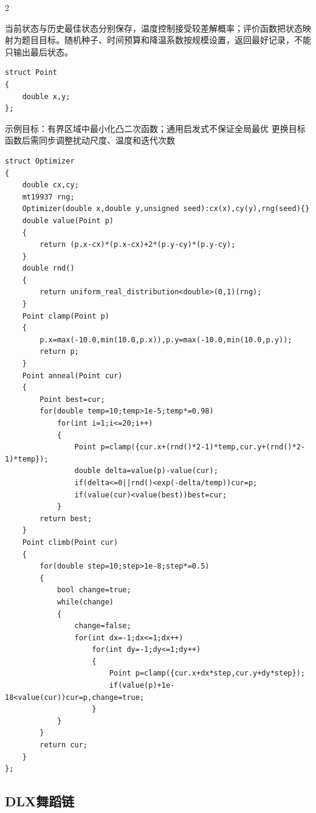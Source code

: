 \documentclass[UTF8,fontset=fandol,a4paper,twoside]{ctexart}
\newcommand{\note}[1]{{\fontsize{10}{12}\selectfont #1\par}}
\begin{document}
\begin{multicols}{2}
\note{当前状态与历史最佳状态分别保存，温度控制接受较差解概率；评价函数把状态映射为题目目标。随机种子、时间预算和降温系数按规模设置，返回最好记录，不能只输出最后状态。}
\begin{lstlisting}
struct Point
{
    double x,y;
};
\end{lstlisting}
\note{示例目标：有界区域中最小化凸二次函数；通用启发式不保证全局最优 更换目标函数后需同步调整扰动尺度、温度和迭代次数}
\begin{lstlisting}
struct Optimizer
{
    double cx,cy;
    mt19937 rng;
    Optimizer(double x,double y,unsigned seed):cx(x),cy(y),rng(seed){}
    double value(Point p)
    {
        return (p.x-cx)*(p.x-cx)+2*(p.y-cy)*(p.y-cy);
    }
    double rnd()
    {
        return uniform_real_distribution<double>(0,1)(rng);
    }
    Point clamp(Point p)
    {
        p.x=max(-10.0,min(10.0,p.x)),p.y=max(-10.0,min(10.0,p.y));
        return p;
    }
    Point anneal(Point cur)
    {
        Point best=cur;
        for(double temp=10;temp>1e-5;temp*=0.98)
            for(int i=1;i<=20;i++)
            {
                Point p=clamp({cur.x+(rnd()*2-1)*temp,cur.y+(rnd()*2-1)*temp});
                double delta=value(p)-value(cur);
                if(delta<=0||rnd()<exp(-delta/temp))cur=p;
                if(value(cur)<value(best))best=cur;
            }
        return best;
    }
    Point climb(Point cur)
    {
        for(double step=10;step>1e-8;step*=0.5)
        {
            bool change=true;
            while(change)
            {
                change=false;
                for(int dx=-1;dx<=1;dx++)
                    for(int dy=-1;dy<=1;dy++)
                    {
                        Point p=clamp({cur.x+dx*step,cur.y+dy*step});
                        if(value(p)+1e-18<value(cur))cur=p,change=true;
                    }
            }
        }
        return cur;
    }
};
\end{lstlisting}
\subsection{DLX舞蹈链}


\end{multicols}
\end{document}
